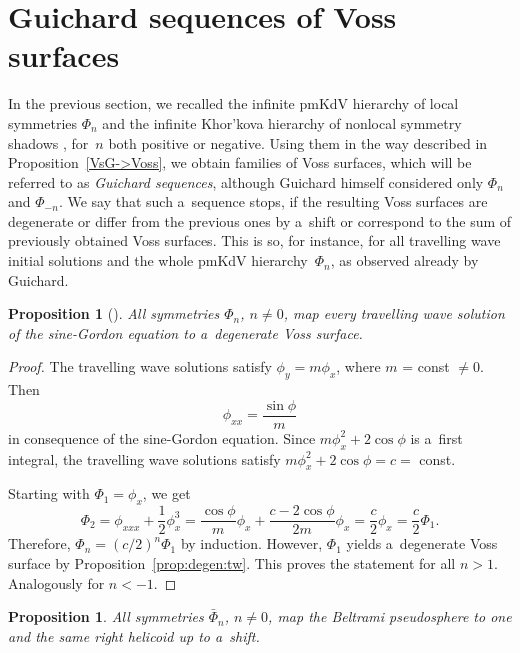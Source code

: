 \documentclass[pdftex]{sigma}
\numberwithin{equation}{section}
\newtheorem{Proposition}[Theorem]{Proposition}
\theoremstyle{definition}
\begin{document}
\section{Guichard sequences of Voss surfaces}
\label{sect:pos}

In the previous section, we recalled the infinite pmKdV hierarchy
of local symmetries $\Phi_n$ and the infinite Khor'kova hierarchy
of nonlocal symmetry shadows ,
for~$n$ both positive or negative.
Using them in the way described in Proposition~\ref{VsG->Voss},
we obtain families of Voss surfaces, which will be referred to as
{\it Guichard sequences}, although Guichard himself considered only
$\Phi_n$ and $\Phi_{-n}$.
We say that such a~sequence stops, if the resulting Voss
surfaces are degenerate or differ from the previous ones by a~shift
or correspond to the sum of previously obtained Voss surfaces.
This is so, for instance, for all travelling wave initial solutions
and the whole pmKdV hierarchy~$\Phi_n$,
as observed already by Guichard.


\begin{Proposition}[{\cite[p.~264]{CG-1890b}}]
\label{prop:tw:f_x}
All symmetries $\Phi_n$, $n \ne 0$, map every travelling wave
solution of the sine-Gordon equation to a~degenerate Voss surface.
\end{Proposition}

\begin{proof}
The travelling wave solutions satisfy
$\phi_y = m \phi_x$, where $m$ = const $\ne 0$.
Then
\[
\phi_{xx} = \frac{\sin\phi}{m}
\]
in consequence of the sine-Gordon equation.
Since $m \phi_x^2 + 2 \cos\phi$ is a~first integral,
the travelling wave solutions satisfy $m \phi_x^2 + 2 \cos\phi = c =$
const.

Starting with $\Phi_1 = \phi_x$, we get
\[
\Phi_2 = \phi_{xxx} + \frac12 \phi_x^3
 = \frac{\cos\phi}{m} \phi_x + \frac{c - 2\cos\phi}{2m} \phi_x
 = \frac{c}{2}\phi_x
 = \frac{c}{2}\Phi_1.
\]
Therefore, $\Phi_n = (c/2)^n \Phi_1$ by induction.
However, $\Phi_1$ yields a~degenerate Voss surface by
Proposition~\ref{prop:degen:tw}.
This proves the statement for all $n > 1$.
Analogously for $n < -1$.
\end{proof}





\begin{Proposition} \label{prop:rhelicoid:R}
All symmetries $\bar\Phi_n$, $n \ne 0$, map the Beltrami
pseudosphere to one and the same right helicoid up to a~shift.
\end{Proposition}
\end{document}
